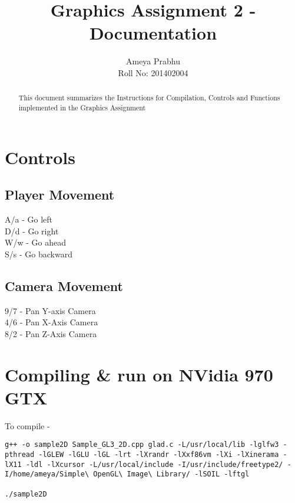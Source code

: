 \documentclass{article}
\begin{document}
\title{Graphics Assignment 2 - Documentation}
\author{Ameya Prabhu\\Roll No: 201402004}

\maketitle

\begin{abstract}
This document summarizes the Instructions for Compilation, Controls and Functions implemented in the Graphics Assignment
\end{abstract}



\section{Controls}

\subsection{Player Movement}
A/a -\> Go left\\
D/d -\> Go right\\
W/w -\> Go ahead\\
S/s -\> Go backward\\

\subsection{Camera Movement}
9/7 -\> Pan Y-axis Camera\\
4/6 -\> Pan X-Axis Camera\\
8/2 -\> Pan Z-Axis Camera\\

\section{Compiling \& run on NVidia 970 GTX}

To compile -\> 
\begin{verbatim}
g++ -o sample2D Sample_GL3_2D.cpp glad.c -L/usr/local/lib -lglfw3 -pthread -lGLEW -lGLU -lGL -lrt -lXrandr -lXxf86vm -lXi -lXinerama -lX11 -ldl -lXcursor -L/usr/local/include -I/usr/include/freetype2/ -I/home/ameya/Simple\ OpenGL\ Image\ Library/ -lSOIL -lftgl

./sample2D

\end{verbatim}
\end{document}
